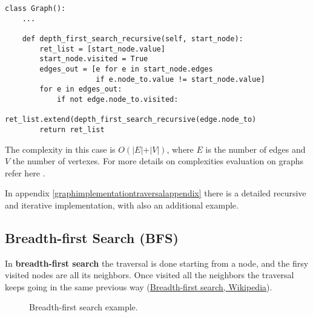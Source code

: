 \begin{lstlisting}[firstnumber=1, caption={Recursive implementation of a depth-first search.}]
class Graph():
	...
	
	def depth_first_search_recursive(self, start_node):
		ret_list = [start_node.value]
		start_node.visited = True
		edges_out = [e for e in start_node.edges
					 if e.node_to.value != start_node.value]
		for e in edges_out:
			if not edge.node_to.visited:
				ret_list.extend(depth_first_search_recursive(edge.node_to)
		return ret_list
\end{lstlisting}

The complexity in this case is \(O(\vert E \vert + \vert V \vert)\), where \(E\) is the number of edges and \(V\) the number of vertexes. For more details on complexities evaluation on graphs refer here \cite{goodrich2013data}.

In appendix \ref{graphimplementationtraversalappendix} there is a detailed recursive and iterative implementation, with also an additional example.
\subsection{Breadth-first Search (BFS)}
In \textbf{breadth-first search} the traversal is done starting from a node, and the firsy visited nodes are all its neighbors. Once visited all the neighbors the traversal keeps going in the same previous way \cite{wikibreadthfirst} (\href{https://en.wikipedia.org/wiki/Breadth-first_search}{Breadth-first search, Wikipedia}).

\begin{figure}[H]
\centering
{}  
\caption[Breadth-first search example.]{Breadth-first search example.}
\label{graphs_7}
\end{figure}

